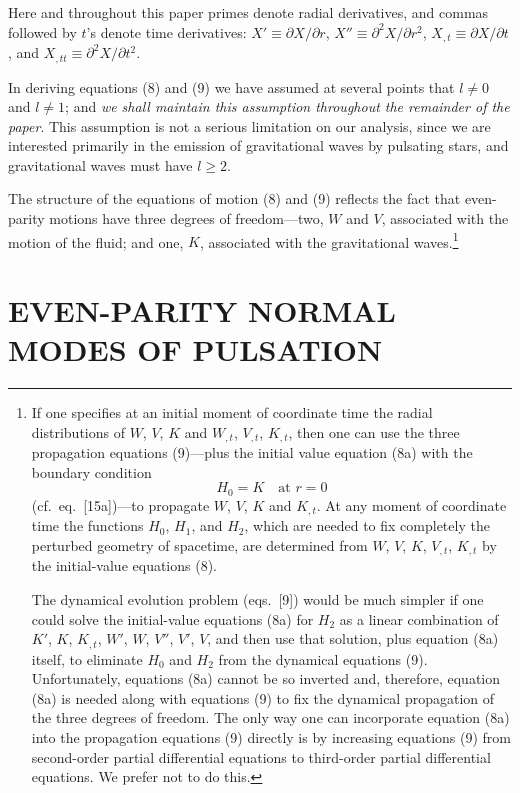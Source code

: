 Here and throughout this paper primes denote radial derivatives, and commas followed
by $t$'s denote time derivatives: $X' \equiv \partial X/\partial r$, $X'' \equiv \partial^{2}X/\partial r^{2}$,
$X_{,t} \equiv \partial X/\partial t$, and $X_{,tt} \equiv \partial^{2}X/\partial t^{2}$.

In deriving equations (8) and (9) we have assumed at several points that $l \neq 0$ and
$l \neq 1$; and \textit{we shall maintain this assumption throughout the remainder of the paper}. This
assumption is not a serious limitation on our analysis, since we are interested primarily
in the emission of gravitational waves by pulsating stars, and gravitational waves must
have $l \geq 2$.

The structure of the equations of motion (8) and (9) reflects the fact that even-parity
motions have three degrees of freedom---two, $W$ and $V$, associated with the motion of
the fluid; and one, $K$, associated with the gravitational waves.\footnote{If one specifies at an
initial moment of coordinate time the radial distributions of $W$, $V$, $K$ and $W_{,t}$, $V_{,t}$, $K_{,t}$,
then one can use the three propagation equations (9)---plus the initial value equation
(8a) with the boundary condition
\begin{equation}
  H_0 = K \quad \text{at } r = 0
\label{eq:10}
\end{equation}
(cf.\ eq.\ [15a])---to propagate $W$, $V$, $K$ and $K_{,t}$. At any moment of coordinate
time the functions $H_0$, $H_1$, and $H_2$, which are needed to fix completely the perturbed
geometry of spacetime, are determined from $W$, $V$, $K$, $V_{,t}$, $K_{,t}$ by the initial-value
equations (8).

The dynamical evolution problem (eqs.\ [9]) would be much simpler if one could solve
the initial-value equations (8a) for $H_2$ as a linear combination of $K'$, $K$, $K_{,t}$, $W'$, $W$,
$V''$, $V'$, $V$, and then use that solution, plus equation (8a) itself, to eliminate $H_0$ and $H_2$
from the dynamical equations (9). Unfortunately, equations (8a) cannot be so inverted
and, therefore, equation (8a) is needed along with equations (9) to fix the dynamical
propagation of the three degrees of freedom. The only way one can incorporate equation
(8a) into the propagation equations (9) directly is by increasing equations (9) from
second-order partial differential equations to third-order partial differential equations. We
prefer not to do this.}

\section{EVEN-PARITY NORMAL MODES OF PULSATION}

